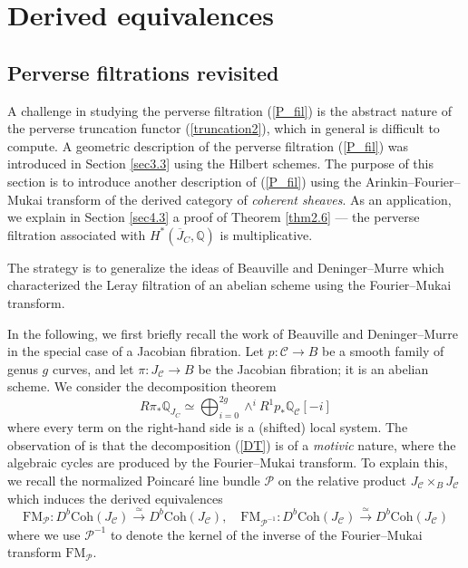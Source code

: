 \documentclass{pspum-l}
\theoremstyle{plain}
\theoremstyle{definition}
\theoremstyle{remark}
\newcommand{\BQ}{{\mathbb{Q}}}
\newcommand{\CC}{{\mathcal C}}
\newcommand{\CP}{{\mathcal P}}
\begin{document}
\section{Derived equivalences}\label{sec4}


\subsection{Perverse filtrations revisited}\label{sec4.1}

A challenge in studying the perverse filtration (\ref{P_fil}) is the abstract nature of the perverse truncation functor (\ref{truncation2}), which in general is difficult to compute. A geometric description of the perverse filtration (\ref{P_fil}) was introduced in Section \ref{sec3.3} using the Hilbert schemes. The purpose of this section is to introduce another description of (\ref{P_fil}) using the Arinkin--Fourier--Mukai transform of the derived category of \emph{coherent sheaves}. As an application, we explain in Section \ref{sec4.3} a proof of Theorem \ref{thm2.6} --- the perverse filtration associated with $H^*(\overline{J}_C, \BQ)$ is multiplicative.

The strategy is to generalize the ideas of Beauville \cite{B, B1} and Deninger--Murre \cite{DM} which characterized the Leray filtration of an abelian scheme using the Fourier--Mukai transform.

In the following, we first briefly recall the work of Beauville and Deninger--Murre in the special case of a Jacobian fibration. Let $p: \CC \to B$ be a smooth family of genus $g$ curves, and let $\pi: J_\CC \to B$ be the Jacobian fibration; it is an abelian scheme. We consider the decomposition theorem
\begin{equation}\label{DT}
R\pi_*\BQ_{J_C} \simeq \bigoplus_{i=0}^{2g} \wedge^i R^1p_* \BQ_\CC[-i]    
\end{equation}
where every term on the right-hand side is a (shifted) local system. The observation of \cite{B,B1, DM} is that the decomposition (\ref{DT}) is of a \emph{motivic} nature, where the algebraic cycles are produced by the Fourier--Mukai transform. To explain this, we recall the normalized Poincar\'e line bundle $\CP$ on the relative product $J_\CC \times_B J_\CC$ which induces the derived equivalences
\[
\mathrm{FM}_{\CP}: D^b \mathrm{Coh}({J}_\CC) \xrightarrow{\simeq}  D^b \mathrm{Coh}({J}_\CC), \quad \mathrm{FM}_{\CP^{-1}} : D^b \mathrm{Coh}({J}_\CC) \xrightarrow{\simeq}  D^b \mathrm{Coh}({J}_\CC)
\]
where we use $\CP^{-1}$ to denote the kernel of the inverse of the Fourier--Mukai transform $\mathrm{FM}_\CP$.
\end{document}

